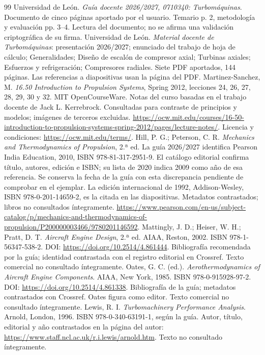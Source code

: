 \documentclass[10pt,openany]{book}
\begin{document}
\begin{thebibliography}{99}
 Universidad de León. \emph{Guía docente 2026/2027, 0710340: Turbomáquinas}. Documento de cinco páginas aportado por el usuario. Temario p. 2, metodología y evaluación pp. 3--4. Lectura del documento; no se afirma una validación criptográfica de su firma.
 Universidad de León. \emph{Material docente de Turbomáquinas}: presentación 2026/2027; enunciado del trabajo de hoja de cálculo; Generalidades; Diseño de escalón de compresor axial; Turbinas axiales; Esfuerzos y refrigeración; Compresores radiales. Siete PDF aportados, 144 páginas. Las referencias a diapositivas usan la página del PDF.
 Martinez-Sanchez, M. \emph{16.50 Introduction to Propulsion Systems}, Spring 2012, lecciones 24, 26, 27, 28, 29, 30 y 32. MIT OpenCourseWare. Notas del curso basadas en el trabajo docente de Jack L. Kerrebrock. Consultadas para contraste de principios y modelos; imágenes de terceros excluidas. \url{https://ocw.mit.edu/courses/16-50-introduction-to-propulsion-systems-spring-2012/pages/lecture-notes/}. Licencia y condiciones: \url{https://ocw.mit.edu/terms/}.
 Hill, P. G.; Peterson, C. R. \emph{Mechanics and Thermodynamics of Propulsion}, 2.ª ed. La guía 2026/2027 identifica Pearson India Education, 2010, ISBN 978-81-317-2951-9. El catálogo editorial confirma título, autores, edición e ISBN; su lista de 2020 indica 2009 como año de esa referencia. Se conserva la fecha de la guía con esta discrepancia pendiente de comprobar en el ejemplar. La edición internacional de 1992, Addison-Wesley, ISBN 978-0-201-14659-2, es la citada en las diapositivas. Metadatos contrastados; libros no consultados íntegramente. \url{https://www.pearson.com/en-us/subject-catalog/p/mechanics-and-thermodynamics-of-propulsion/P200000003466/9780201146592}.
 Mattingly, J. D.; Heiser, W. H.; Pratt, D. T. \emph{Aircraft Engine Design}, 2.ª ed. AIAA, Reston, 2002. ISBN 978-1-56347-538-2. DOI: \url{https://doi.org/10.2514/4.861444}. Bibliografía recomendada por la guía; identidad contrastada con el registro editorial en Crossref. Texto comercial no consultado íntegramente.
 Oates, G. C. (ed.). \emph{Aerothermodynamics of Aircraft Engine Components}. AIAA, New York, 1985. ISBN 978-0-915928-97-2. DOI: \url{https://doi.org/10.2514/4.861338}. Bibliografía de la guía; metadatos contrastados con Crossref. Oates figura como editor. Texto comercial no consultado íntegramente.
 Lewis, R. I. \emph{Turbomachinery Performance Analysis}. Arnold, London, 1996. ISBN 978-0-340-63191-1, según la guía. Autor, título, editorial y año contrastados en la página del autor: \url{https://www.staff.ncl.ac.uk/r.i.lewis/arnold.htm}. Texto no consultado íntegramente.

\end{thebibliography}
\end{document}
